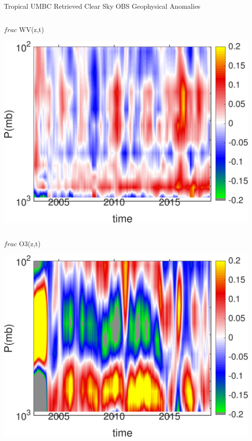 \documentclass[10pt,t]{beamer}
\begin{document}
\begin{frame}{Tropical UMBC Retrieved Clear Sky OBS Geophysical Anomalies}
\begin{columns}
\begin{column}{0.45\columnwidth}
\begin{block}{\footnotesize $frac$ WV(z,t)}
\vspace{-0.1in}
\begin{center}
\includegraphics[width=\linewidth]{Figs/ClearAnom/umbc_clr_retr_obs_wv_anom_200209_201808.png}
\end{center}
\end{block}
\end{column}
\end{columns}

\vspace{-0.25in}

\begin{columns}
\begin{column}{0.45\columnwidth}
\begin{block}{\footnotesize $frac$ O3(z,t)}
\vspace{-0.1in}
\begin{center}
\includegraphics[width=\linewidth]{Figs/ClearAnom/umbc_clr_retr_obs_o3_anom_200209_201808.png}
\end{center}
\end{block}
\end{column}


\end{columns}
\end{frame}
\end{document}
